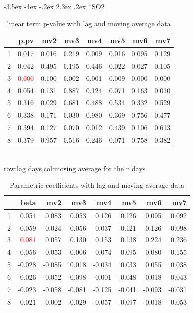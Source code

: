 \documentclass[a4paper, 12pt]{article}
\makeatletter
\def\large{\fontsize{14}{20}\selectfont}
\renewcommand\subsection{\@startsection {subsection}{1}{\z@}%
                                   {-3.5ex \@plus -1ex \@minus -.2ex}%
                                   {2.3ex \@plus.2ex}%
                                   {\centering\normalfont\large\bfseries}}
\makeatother
\begin{document}
\subsection*{SO2}
\begin{table}[h]
\centering
\caption{linear term p-value with lag and moving average data}
\begin{tabular}{rrrrrrrr}
  \hline
 & p.pv & mv2 & mv3 & mv4 & mv5 & mv6 & mv7 \\
  \hline
1 & 0.017 & 0.016 & 0.219 & 0.009 & 0.016 & 0.095 & 0.129 \\
  2 & 0.042 & 0.495 & 0.195 & 0.446 & 0.022 & 0.027 & 0.105 \\
  3 & \textcolor{red}{0.000} & 0.100 & 0.002 & 0.001 & 0.009 & 0.000 & 0.000 \\
  4 & 0.054 & 0.131 & 0.887 & 0.124 & 0.071 & 0.163 & 0.010 \\
  5 & 0.316 & 0.029 & 0.681 & 0.488 & 0.534 & 0.332 & 0.529 \\
  6 & 0.338 & 0.171 & 0.030 & 0.980 & 0.369 & 0.756 & 0.477 \\
  7 & 0.394 & 0.127 & 0.070 & 0.012 & 0.439 & 0.106 & 0.613 \\
  8 & 0.379 & 0.957 & 0.516 & 0.246 & 0.071 & 0.758 & 0.382 \\
   \hline
\end{tabular}
\\row:lag days,col:moving average for the n days
\end{table}

\begin{table}[h]
\centering
\caption{Parametric coefficients with lag and moving average data}
\begin{tabular}{rrrrrrrr}
  \hline
 & beta & mv2 & mv3 & mv4 & mv5 & mv6 & mv7 \\
  \hline
1 & 0.054 & 0.083 & 0.053 & 0.126 & 0.126 & 0.095 & 0.092 \\
  2 & -0.059 & 0.024 & 0.056 & 0.037 & 0.121 & 0.126 & 0.098 \\
  3 & \textcolor{red}{0.081} & 0.057 & 0.130 & 0.153 & 0.138 & 0.224 & 0.236 \\
  4 & -0.056 & 0.053 & 0.006 & 0.074 & 0.095 & 0.080 & 0.155 \\
  5 & -0.028 & -0.085 & 0.018 & -0.034 & 0.033 & 0.055 & 0.038 \\
  6 & -0.026 & -0.052 & -0.098 & -0.001 & -0.048 & 0.018 & 0.043 \\
  7 & -0.023 & -0.058 & -0.081 & -0.125 & -0.041 & -0.093 & -0.031 \\
  8 & 0.021 & -0.002 & -0.029 & -0.057 & -0.097 & -0.018 & -0.053 \\
   \hline
\end{tabular}
\end{table}
\clearpage
\end{document}

